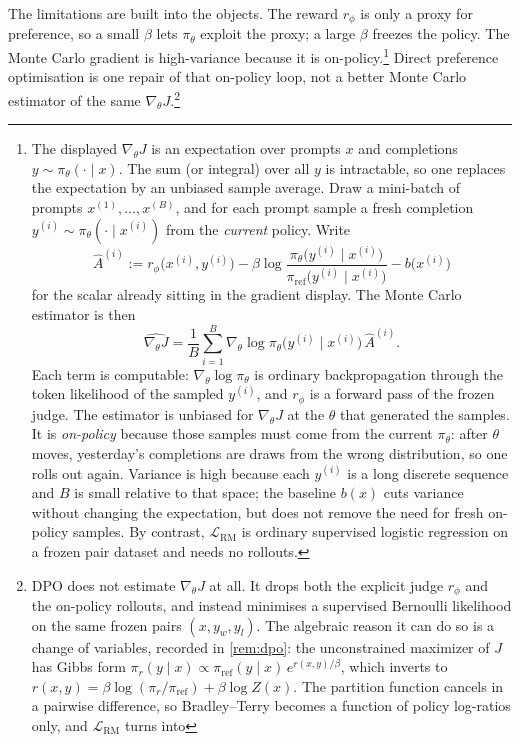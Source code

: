 \documentclass[11pt,a4paper]{article}
\theoremstyle{definition}
\begin{document}
The limitations are built into the objects. The reward \(r_\phi\) is only a proxy for preference, so a small \(\beta\) lets \(\pi_\theta\) exploit the proxy; a large \(\beta\) freezes the policy. The Monte Carlo gradient is high-variance because it is on-policy.\footnote{The displayed \(\nabla_\theta J\) is an expectation over prompts \(x\) and completions \(y\sim\pi_\theta(\cdot\mid x)\). The sum (or integral) over all \(y\) is intractable, so one replaces the expectation by an unbiased sample average. Draw a mini-batch of prompts \(x^{(1)},\ldots,x^{(B)}\), and for each prompt sample a fresh completion \(y^{(i)}\sim\pi_\theta(\cdot\mid x^{(i)})\) from the \emph{current} policy. Write
\[
\widehat A^{(i)}
:=
r_\phi\bigl(x^{(i)},y^{(i)}\bigr)
-\beta\log\frac{\pi_\theta\bigl(y^{(i)}\mid x^{(i)}\bigr)}{\pi_{\mathrm{ref}}\bigl(y^{(i)}\mid x^{(i)}\bigr)}
-b\bigl(x^{(i)}\bigr)
\]
for the scalar already sitting in the gradient display. The Monte Carlo estimator is then
\[
\widehat{\nabla_\theta J}
=\frac1B\sum_{i=1}^B
\nabla_\theta\log\pi_\theta\bigl(y^{(i)}\mid x^{(i)}\bigr)\,
\widehat A^{(i)}.
\]
Each term is computable: \(\nabla_\theta\log\pi_\theta\) is ordinary backpropagation through the token likelihood of the sampled \(y^{(i)}\), and \(r_\phi\) is a forward pass of the frozen judge. The estimator is unbiased for \(\nabla_\theta J\) at the \(\theta\) that generated the samples. It is \emph{on-policy} because those samples must come from the current \(\pi_\theta\): after \(\theta\) moves, yesterday's completions are draws from the wrong distribution, so one rolls out again. Variance is high because each \(y^{(i)}\) is a long discrete sequence and \(B\) is small relative to that space; the baseline \(b(x)\) cuts variance without changing the expectation, but does not remove the need for fresh on-policy samples. By contrast, \(\mathcal{L}_{\mathrm{RM}}\) is ordinary supervised logistic regression on a frozen pair dataset and needs no rollouts.} Direct preference optimisation is one repair of that on-policy loop, not a better Monte Carlo estimator of the same \(\nabla_\theta J\).\footnote{DPO does not estimate \(\nabla_\theta J\) at all. It drops both the explicit judge \(r_\phi\) and the on-policy rollouts, and instead minimises a supervised Bernoulli likelihood on the same frozen pairs \((x,y_w,y_l)\). The algebraic reason it can do so is a change of variables, recorded in \cref{rem:dpo}: the unconstrained maximizer of \(J\) has Gibbs form \(\pi_r(y\mid x)\propto\pi_{\mathrm{ref}}(y\mid x)\,e^{r(x,y)/\beta}\), which inverts to \(r(x,y)=\beta\log(\pi_r/\pi_{\mathrm{ref}})+\beta\log Z(x)\). The partition function cancels in a pairwise difference, so Bradley--Terry becomes a function of policy log-ratios only, and \(\mathcal{L}_{\mathrm{RM}}\) turns into
}
\end{document}
